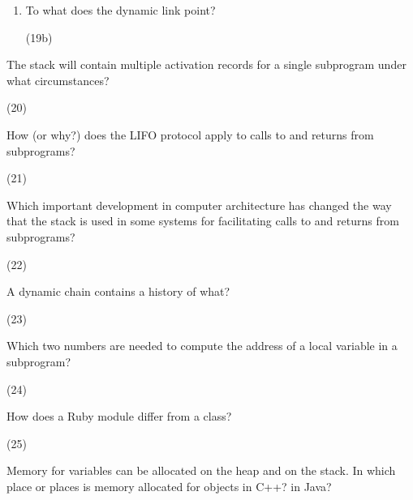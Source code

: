 \begin{enumerate}
\begin{answer}
\begin{answer}
\begin{enumerate}
    \item To what does the dynamic link point?
      \begin{answer}
        (19b)
        \end{answer}

    \end{enumerate}

  \item The stack will contain multiple activation
    records for a single subprogram under what
    circumstances?

  \begin{answer}
    (20)
    \end{answer}

  \item How (or why?) does the LIFO protocol apply to
    calls to and returns from subprograms?
  
  \begin{answer}
    (21)
    \end{answer}

  \item Which important development in computer architecture
    has changed the way that the stack is used in some
    systems for facilitating calls to and returns from
    subprograms?

\begin{answer}
    (22)
    \end{answer}

  \item A dynamic chain contains a history of what?

\begin{answer}
    (23)
    \end{answer}
 

  \item Which two numbers are needed to compute
    the address of a local variable in a subprogram?

\begin{answer}
    (24)
    \end{answer}


  \item How does a Ruby module differ from a class?

    \begin{answer}
    (25)
    \end{answer}

  \item Memory for variables can be allocated on the heap
    and on the stack. In which place or places is memory
    allocated for objects in C++? in Java?


\end{answer}
\end{answer}
\end{enumerate}
